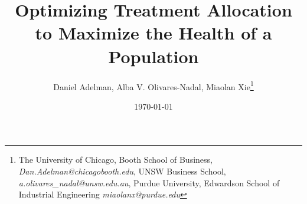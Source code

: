\documentclass[12pt,a4paper]{article}
\begin{document}
	
	
\title{\bfseries {\Large Optimizing Treatment Allocation to Maximize the Health of a Population}
}


\author{\small Daniel Adelman, Alba V. Olivares-Nadal, Miaolan Xie\thanks{The University of Chicago, Booth School of Business, \textit{Dan.Adelman@chicagobooth.edu}, UNSW Business School, \textit{a.olivares\_nadal@unsw.edu.au}, Purdue University, Edwardson School of Industrial Engineering
        \textit{miaolanx@purdue.edu}}}

\date{\small \today}
\maketitle
\thispagestyle{empty}
	

	
	
\end{document}
